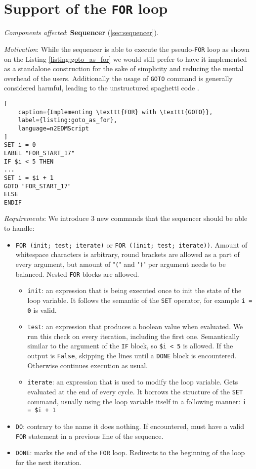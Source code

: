 \section{Support of the \texttt{FOR} loop}

\textit{Components affected}: \textbf{Sequencer} (\ref{sec:sequencer}).

\textit{Motivation}: While the sequencer is able to execute the pseudo-\texttt{FOR} loop as shown on the Listing \ref{listing:goto_as_for} we would still prefer to have it implemented as a standalone construction for the sake of simplicity and reducing the mental overhead of the users. Additionally the usage of \texttt{GOTO} command is generally considered \cite{Dijkstra1968} harmful, leading to the unstructured spaghetti code \cite{Cram2005}.

\begin{lstlisting}[
	caption={Implementing \texttt{FOR} with \texttt{GOTO}}, 
	label={listing:goto_as_for}, 
	language=n2EDMScript
]
SET i = 0
LABEL "FOR_START_17"
IF $i < 5 THEN
...
SET i = $i + 1
GOTO "FOR_START_17"
ELSE
ENDIF
\end{lstlisting}

\textit{Requirements}: We introduce 3 new commands that the sequencer should be able to handle:

\begin{itemize}
	\item \texttt{FOR (init; test; iterate)} or \texttt{FOR ((init; test; iterate))}. Amount of whitespace characters is arbitrary, round brackets are allowed as a part of every argument, but amount of "\texttt{(}" and "\texttt{)}" per argument needs to be balanced. Nested \texttt{FOR} blocks are allowed.
	\begin{itemize}
		\item \texttt{init}: an expression that is being executed once to init the state of the loop variable. It follows the semantic of the \texttt{SET} operator, for example \texttt{i = 0} is valid.
		\item \texttt{test}: an expression that produces a boolean value when evaluated. We run this check on every iteration, including the first one. Semantically similar to the argument of the \texttt{IF} block, so \texttt{\$i < 5} is allowed. If the output is \texttt{False}, skipping the lines until a \texttt{DONE} block is encountered. Otherwise continues execution as usual.
		\item \texttt{iterate}: an expression that is used to modify the loop variable. Gets evaluated at the end of every cycle. It borrows the structure of the \texttt{SET} command, usually using the loop variable itself in a following manner: \texttt{i = \$i + 1}
	\end{itemize}
	\item \texttt{DO}: contrary to the name it does nothing. If encountered, must have a valid \texttt{FOR} statement in a previous line of the sequence.
	\item \texttt{DONE}: marks the end of the \texttt{FOR} loop. Redirects to the beginning of the loop for the next iteration.
\end{itemize}

